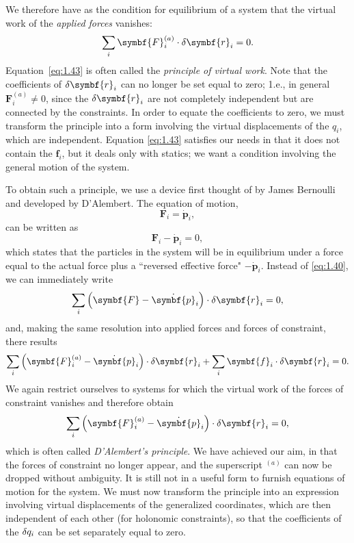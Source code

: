 We therefore have as the condition for equilibrium of a system that the virtual work of the \emph{applied forces} vanishes:
\begin{equation}
    \sum_i\symbf{F}_i^{\left(a\right)}\cdot\fdif{\symbf{r}_i}=0.\label{eq:1.43}
\end{equation}
Equation~\eqref{eq:1.43} is often called the \emph{principle of virtual work}. Note that the coefficients of \(\fdif{\symbf{r}_i}\) can no longer be set equal to zero; 1.e., in general \(\symbf{F}_i^{\left(a\right)}\ne0\), since the \(\fdif{\symbf{r}_i}\) are not completely independent but are connected by the constraints. In order to equate the coefficients to zero, we must transform the principle into a form involving the virtual displacements of the \(q_i\), which are independent. Equation \eqref{eq:1.43} satisfies our needs in that it does not contain the \(\symbf{f}_i\), but it deals only with statics; we want a condition involving the general motion of the system.

To obtain such a principle, we use a device first thought of by James Bernoulli and developed by D'Alembert. The equation of motion,
\begin{equation*}
    \symbf{F}_i=\dot{\symbf{p}}_i,
\end{equation*}
can be written as
\begin{equation*}
    \symbf{F}_i-\dot{\symbf{p}}_i=0,
\end{equation*}
which states that the particles in the system will be in equilibrium under a force equal to the actual force plus a ``reversed effective force" \(-\dot{\symbf{p}}_i\). Instead of \eqref{eq:1.40}, we can immediately write
\begin{equation}
    \sum_i\left(\symbf{F}-\dot{\symbf{p}}_i\right)\cdot\fdif{\symbf{r}_i}=0,
\end{equation}
and, making the same resolution into applied forces and forces of constraint, there results
\begin{equation*}
    \sum_i\left(\symbf{F}_i^{\left(a\right)}-\dot{\symbf{p}}_i\right)\cdot\fdif{\symbf{r}_i}+\sum_i\symbf{f}_i\cdot\fdif{\symbf{r}_i}=0.
\end{equation*}
We again restrict ourselves to systems for which the virtual work of the forces of constraint vanishes and therefore obtain
\begin{equation}
    \sum_i\left(\symbf{F}_i^{\left(a\right)}-\dot{\symbf{p}}_i\right)\cdot\fdif{\symbf{r}_i}=0,\label{eq:1.45}
\end{equation}
which is often called \emph{D'Alembert's principle}. We have achieved our aim, in that the forces of constraint no longer appear, and the superscript \(^{\left(a\right)}\) can now be dropped without ambiguity. It is still not in a useful form to furnish equations of motion for the system. We must now transform the principle into an expression involving virtual displacements of the generalized coordinates, which are then independent of each other (for holonomic constraints), so that the coefficients of the \(\fdif{q_i}\) can be set separately equal to zero.

